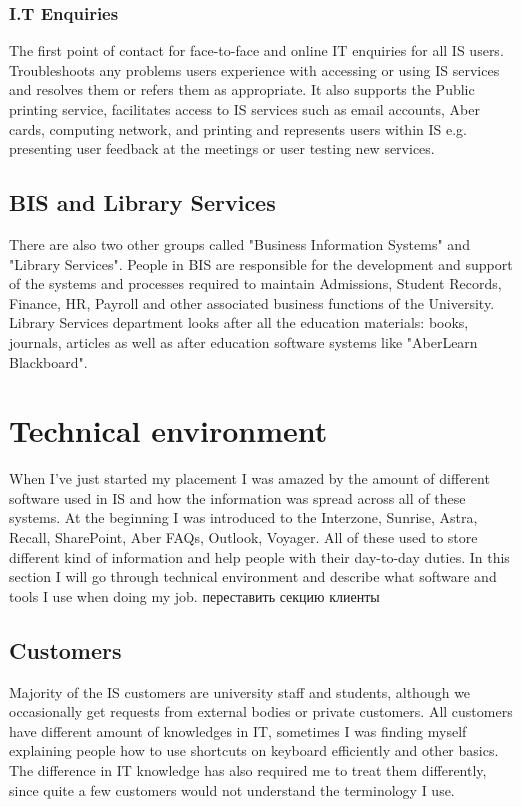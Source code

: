 \documentclass[10pt,a4paper,headinclude=true]{report}
\begin{document}
\subsection{I.T Enquiries}
The first point of contact for face-to-face and online IT enquiries for all IS users. Troubleshoots any problems users experience with accessing or using IS services and resolves them or refers them as appropriate. It also supports the Public printing service, facilitates access to IS services such as email accounts, Aber cards, computing network, and printing and represents users within IS e.g. presenting user feedback at the meetings or user testing new services. \cite{InternalTeamdescription}

\section{BIS and Library Services}
There are also two other groups called "Business Information Systems" and "Library Services". People in BIS are  responsible for the development and support of the systems and processes required to maintain Admissions, Student Records, Finance, HR, Payroll and other associated business functions of the University. Library Services department looks after all the education materials: books, journals, articles as well as after education software systems like "AberLearn Blackboard".\cite{InternalTeamdescription}

\chapter{Technical environment}
When I've just started my placement I was amazed by the amount of different software used in IS and how the information was spread across all of these systems. At the beginning I was introduced to the Interzone, Sunrise, Astra, Recall, SharePoint, Aber FAQs, Outlook, Voyager. All of these used to store different kind of information and help people with their day-to-day duties. In this section I will go through technical environment and describe what software and tools I use when doing my job.
переставить секцию клиенты
\section{Customers}
Majority of the IS customers are university staff and students, although we occasionally get requests from external bodies or private customers. All customers have different amount of knowledges in IT, sometimes I was finding myself explaining people how to use shortcuts on keyboard efficiently and other basics. The difference in IT knowledge has also required me to treat them differently, since quite a few customers would not understand the terminology I use.
\end{document}
